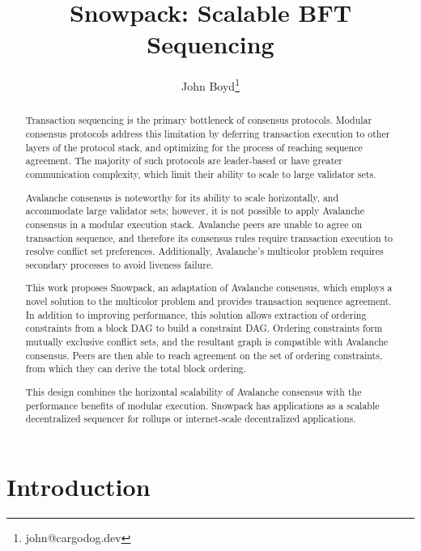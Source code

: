 \documentclass[12pt]{article}
\begin{document}
\title{Snowpack: Scalable BFT Sequencing}
\author{John Boyd\thanks{john@cargodog.dev}}
\maketitle

\begin{abstract}
  Transaction sequencing is the primary bottleneck of consensus protocols.
  Modular consensus protocols address this limitation by deferring transaction
  execution to other layers of the protocol stack, and optimizing for the
  process of reaching sequence agreement. The majority of such protocols are
  leader-based or have greater communication complexity, which limit their
  ability to scale to large validator sets.

  Avalanche consensus is noteworthy for its ability to scale horizontally, and
  accommodate large validator sets; however, it is not possible to apply
  Avalanche consensus in a modular execution stack. Avalanche peers are unable
  to agree on transaction sequence, and therefore its consensus rules require
  transaction execution to resolve conflict set preferences. Additionally,
  Avalanche's multicolor problem requires secondary processes to avoid liveness
  failure.

  This work proposes Snowpack, an adaptation of Avalanche consensus, which
  employs a novel solution to the multicolor problem and provides transaction
  sequence agreement. In addition to improving performance, this solution
  allows extraction of ordering constraints from a block DAG to build a
  constraint DAG. Ordering constraints form mutually exclusive conflict sets,
  and the resultant graph is compatible with Avalanche consensus. Peers are
  then able to reach agreement on the set of ordering constraints, from which
  they can derive the total block ordering.

  This design combines the horizontal scalability of Avalanche consensus with
  the performance benefits of modular execution. Snowpack has applications as a
  scalable decentralized sequencer for rollups or internet-scale decentralized
  applications.
\end{abstract}

\section{Introduction}
\end{document}
